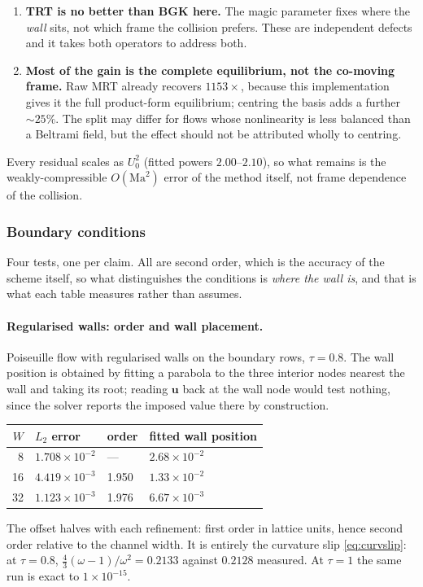 \documentclass[11pt,a4paper]{article}
\newcommand{\uu}{\bm{u}}
\newcommand{\e}[1]{\times 10^{#1}}
\begin{document}
\begin{enumerate}[leftmargin=1.4em,itemsep=3pt]
\item \textbf{TRT is no better than BGK here.} The magic parameter fixes where the
  \emph{wall} sits, not which frame the collision prefers. These are independent
  defects and it takes both operators to address both.
\item \textbf{Most of the gain is the complete equilibrium, not the co-moving
  frame.} Raw MRT already recovers $1153\times$, because this implementation gives
  it the full product-form equilibrium; centring the basis adds a further $\sim25\%$.
  The split may differ for flows whose nonlinearity is less balanced than a
  Beltrami field, but the effect should not be attributed wholly to centring.
\end{enumerate}

\noindent Every residual scales as $U_0^2$ (fitted powers $2.00$--$2.10$), so what
remains is the weakly-compressible $O(\mathrm{Ma}^2)$ error of the method itself,
not frame dependence of the collision.
\subsubsection{Boundary conditions}
\label{sec:bcvalid}

Four tests, one per claim. All are second order, which is the accuracy of the
scheme itself, so what distinguishes the conditions is \emph{where the wall is},
and that is what each table measures rather than assumes.

\paragraph{Regularised walls: order and wall placement.} Poiseuille flow with
regularised walls on the boundary rows, $\tau=0.8$. The wall position is obtained
by fitting a parabola to the three interior nodes nearest the wall and taking its
root; reading $\uu$ back at the wall node would test nothing, since the solver
reports the imposed value there by construction.
\begin{center}\small
\begin{tabular}{rlll}
\toprule
$W$ & $L_2$ error & order & fitted wall position \\
\midrule
8  & $1.708\e{-2}$ & ---   & $2.68\e{-2}$ \\
16 & $4.419\e{-3}$ & 1.950 & $1.33\e{-2}$ \\
32 & $1.123\e{-3}$ & 1.976 & $6.67\e{-3}$ \\
\bottomrule
\end{tabular}
\end{center}
\noindent The offset halves with each refinement: first order in lattice units,
hence second order relative to the channel width. It is entirely the curvature
slip \eqref{eq:curvslip}: at $\tau=0.8$, $\frac43(\omega-1)/\omega^2 = 0.2133$
against $0.2128$ measured. At $\tau=1$ the same run is exact to $1\e{-15}$.
\end{document}

